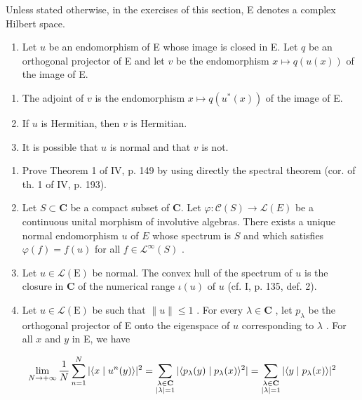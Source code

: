 \exercisesection{}

Unless stated otherwise, in the exercises of this section, E denotes a complex Hilbert space.

\begin{enumerate}
\def\labelenumi{\arabic{enumi})}
\tightlist
\item
  Let \(u\) be an endomorphism of E whose image is closed in E. Let \(q\) be an orthogonal projector of E and let \(v\) be the endomorphism \(x \mapsto q(u(x))\) of the image of E.
\end{enumerate}

\begin{enumerate}
\def\labelenumi{\alph{enumi})}
\item
  The adjoint of \(v\) is the endomorphism \(x \mapsto q(u^{*}(x))\) of the image of E.
\item
  If \(u\) is Hermitian, then \(v\) is Hermitian.
\item
  It is possible that \(u\) is normal and that \(v\) is not.
\end{enumerate}

\begin{enumerate}
\def\labelenumi{\arabic{enumi})}
\setcounter{enumi}{1}
\item
  Prove Theorem 1 of IV, p. 149 by using directly the spectral theorem (cor. of th. 1 of IV, p. 193).
\item
  Let \(S \subset \mathbf{C}\) be a compact subset of \(\mathbf{C}\). Let \(\varphi \colon \mathcal{C}(S) \to \mathcal{L}(E)\) be a continuous unital morphism of involutive algebras. There exists a unique normal endomorphism \(u\) of \(E\) whose spectrum is \(S\) and which satisfies \(\varphi(f) = f(u)\) for all \(f \in \mathcal{L}^{\infty}(S)\) .
\item
  Let \(u \in \mathcal{L}(\mathrm{E})\) be normal. The convex hull of the spectrum of \(u\) is the closure in \(\mathbf{C}\) of the numerical range \(\iota(u)\) of \(u\) (cf. I, p. 135, def. 2).
\item
  Let \(u \in \mathcal{L}(\mathrm{E})\) be such that \(\| u \| \leqslant 1\) . For every \(\lambda \in \mathbf{C}\) , let \(p_{\lambda}\) be the orthogonal projector of E onto the eigenspace of \(u\) corresponding to \(\lambda\) . For all \(x\) and \(y\) in E, we have
\end{enumerate}

\[
\lim_{N\to +\infty}\frac{1}{N}\sum_{n = 1}^{N}|\langle x \mid u^{n}(y)\rangle |^{2} = \sum_{\substack{\lambda \in \mathbf{C}\\ |\lambda | = 1}}|\langle p_{\lambda}(y) \mid p_{\lambda}(x)\rangle^{2}|\\ = \sum_{\substack{\lambda \in \mathbf{C}\\ |\lambda | = 1}}|\langle y \mid p_{\lambda}(x)\rangle |^{2}
\]

